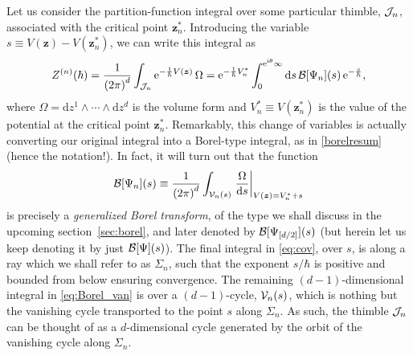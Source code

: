 \documentclass[11pt,a4paper]{article}
\newcommand{\CB}{{\cal B}}
\newcommand{\CJ}{{\cal J}}
\newcommand{\CV}{{\cal V}}
\newcommand{\be}{\begin{equation}}
\newcommand{\ee}{\end{equation}}
\newcommand{\rme}{{\mathrm{e}}}
\newcommand{\rmi}{{\mathrm{i}}}
\newcommand{\rmd}{{\mathrm{d}}}
\begin{document}
Let us consider the partition-function integral over some particular thimble, $\CJ_n$, associated with the critical point $\boldsymbol{z}^*_n$. Introducing the variable $s \equiv V (\boldsymbol{z}) - V (\boldsymbol{z}^*_n)$, we can write this integral as
%
\be
\label{eq:cov}
Z^{(n)} (\hbar) = \frac{1}{\left( 2\pi \right)^d} \int_{\CJ_n} \rme^{- \frac{1}{\hbar} V(\boldsymbol{z})}\, \Omega = \rme^{- \frac{1}{\hbar} V^*_n} \int_{0}^{\rme^{\rmi\theta}\infty} \rmd s\, \CB[\Psi_n](s)\, \rme^{-\frac{s}{\hbar}},
\ee
%
\noindent
where $\Omega = \rmd z^1 \wedge \cdots \wedge \rmd z^d$ is the volume form and $V^*_n \equiv V (\boldsymbol{z}^*_n)$ is the value of the potential at the critical point $\boldsymbol{z}^*_n$. Remarkably, this change of variables is actually converting our original integral into a Borel-type integral, as in \eqref{borelresum} (hence the notation!). In fact, it will turn out that the function
%
\be
\label{eq:Borel_van}
\CB[\Psi_n](s) \equiv \frac{1}{\left( 2\pi \right)^d} \int_{\CV_n (s)} \left. \frac{\Omega}{\rmd s} \right|_{V (\boldsymbol{z}) = V^*_n + s}
\ee
%
\noindent
is precisely a \textit{generalized Borel transform}, of the type we shall discuss in the upcoming section~\ref{sec:borel}, and later denoted by $\CB[\Psi_{[d/2]}](s)$ (but herein let us keep denoting it by just $\CB[\Psi](s)$). The final integral in \eqref{eq:cov}, over $s$, is along a ray which we shall refer to as $\Sigma_n$, such that the exponent $s/\hbar$ is positive and bounded from below ensuring convergence. The remaining $(d-1)$-dimensional integral in \eqref{eq:Borel_van} is over a $(d-1)$-cycle, $\CV_n(s)$, which is nothing but the vanishing cycle transported to the point $s$ along $\Sigma_n$. As such, the thimble $\CJ_n$ can be thought of as a $d$-dimensional cycle generated by the orbit of the vanishing cycle along $\Sigma_n$.
\end{document}

